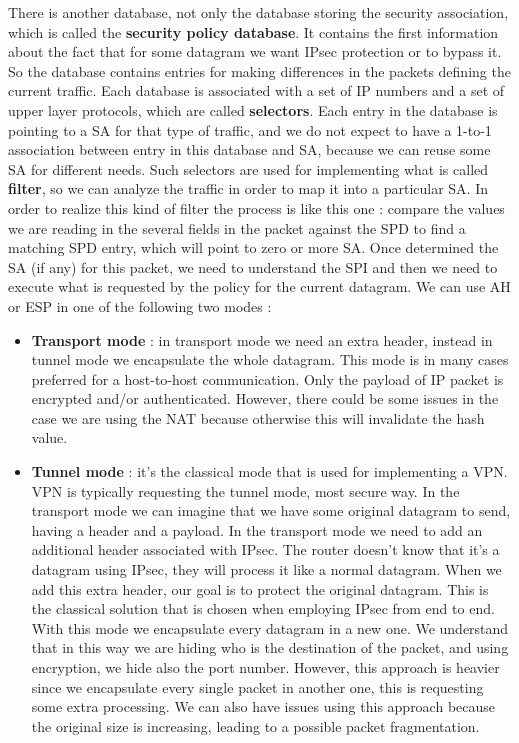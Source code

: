 \documentclass[11pt]{article}
\begin{document}
There is another database, not only the database storing the security association, which is called the \textbf{security policy database}. It contains the first information about the fact that for some datagram we want IPsec protection or to bypass it. So the database contains entries for making differences in the packets defining the current traffic. Each database is associated with a set of IP numbers and a set of upper layer protocols, which are called \textbf{selectors}. Each entry in the database is pointing to a SA for that type of traffic, and we do not expect to have a 1-to-1 association between entry in this database and SA, because we can reuse some SA for different needs. Such selectors are used for implementing what is called \textbf{filter}, so we can analyze the traffic in order to map it into a particular SA. In order to realize this kind of filter the process is like this one : compare the values we are reading in the several fields in the packet against the SPD to find a matching SPD entry, which will point to zero or more SA. Once determined the SA (if any) for this packet, we need to understand the SPI and then we need to execute what is requested by the policy for the current datagram. We can use AH or ESP in one of the following two modes :
\begin{itemize}
\item \textbf{Transport mode} : in transport mode we need an extra header, instead in tunnel mode we encapsulate the whole datagram. This mode is in many cases preferred for a host-to-host communication. Only the payload of IP packet is encrypted and/or authenticated. However, there could be some issues in the case we are using the NAT because otherwise this will invalidate the hash value.
\item \textbf{Tunnel mode} : it's the classical mode that is used for implementing a VPN. VPN is typically requesting the tunnel mode, most secure way. In the transport mode we can imagine that we have some original datagram to send, having a header and a payload. In the transport mode we need to add an additional header associated with IPsec. The router doesn't know that it's a datagram using IPsec, they will process it like a normal datagram. When we add this extra header, our goal is to protect the original datagram. This is the classical solution that is chosen when employing IPsec from end to end. With this mode we encapsulate every datagram in a new one. We understand that in this way we are hiding who is the destination of the packet, and using encryption, we hide also the port number. However, this approach is heavier since we encapsulate every single packet in another one, this is requesting some extra processing. We can also have issues using this approach because the original size is increasing, leading to a possible packet fragmentation.
\end{itemize}
\end{document}
